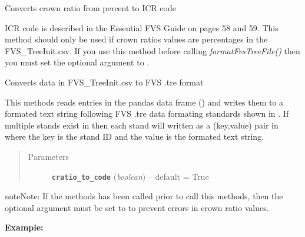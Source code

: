 \documentclass[letterpaper,10pt,english]{sphinxmanual}
\begin{document}
\begin{fulllineitems}
\begin{fulllineitems}
\label{Inventory:fuels.Inventory.crwratio_percent_to_code}
Converts crown ratio from percent to ICR code

ICR code is described in the Essential FVS Guide on pages 58 and 59.
This method should only be used if crown ratios values are percentages
in the FVS\_TreeInit.csv.  If you use this method before calling
\emph{formatFvsTreeFile()} then you must set the optional argument
 to .

\end{fulllineitems}


\begin{fulllineitems}
\label{Inventory:fuels.Inventory.format_fvs_tree_file}
Converts data in FVS\_TreeInit.csv to FVS .tre format

This methods reads entries in the pandas data frame () and
writes them to a formated text string following FVS .tre data formating
standards shown in .  If multiple stands exist in 
then each stand will written as a (key,value) pair in
 where the key is the stand ID and the value is the
formated text string.
\begin{quote}\begin{description}
\item[{Parameters}] \leavevmode
\textbf{\texttt{cratio\_to\_code}} (\emph{boolean}) -- default = True

\end{description}\end{quote}

\begin{notice}{note}{Note:}
If the  methods has
been called prior to call this methods, then the 
optional argument must be set to  to prevent errors in crown
ratio values.
\end{notice}

\textbf{Example:}


\end{fulllineitems}
\end{fulllineitems}
\end{document}
